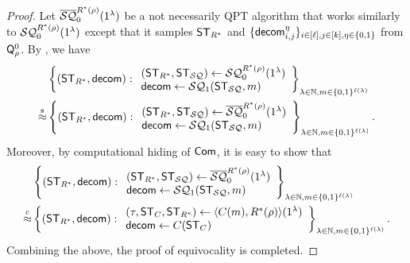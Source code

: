 \begin{proof}
Let $\overline{\mathcal{SQ}}_0^{R^*(\rho)}(1^\lambda)$ be a not necessarily QPT algorithm that works similarly to $\mathcal{SQ}_0^{R^*(\rho)}(1^\lambda)$ except that it samples $\mathsf{ST}_{R^*}$ and $\{\mathsf{decom}_{i,j}^{\eta}\}_{i\in[\ell],j\in[k],\eta\in\{0,1\}}$ from $\mathsf{Q}_\rho^0$.  
By , we have 
\begin{align*}
   &\left\{
   (\mathsf{ST}_{R^*},\mathsf{decom}):
   \begin{array}{ll}
   (\mathsf{ST}_{R^*},\mathsf{ST}_{\mathcal{SQ}})\gets \mathcal{SQ}_0^{R^*(\rho)}(1^\lambda)\\
   \mathsf{decom}\gets \mathcal{SQ}_1(\mathsf{ST}_{\mathcal{SQ}},m)
   \end{array}
   \right\}_{\lambda\in \mathbb{N},m\in \{0,1\}^{\ell(\lambda)}}\\
   \stackrel{\text{s}}{\approx}
   &\left\{
   (\mathsf{ST}_{R^*},\mathsf{decom}):
   \begin{array}{ll}
   (\mathsf{ST}_{R^*},\mathsf{ST}_{\mathcal{SQ}})\gets \overline{\mathcal{SQ}}_0^{R^*(\rho)}(1^\lambda)\\
   \mathsf{decom}\gets \mathcal{SQ}_1(\mathsf{ST}_{\mathcal{SQ}},m)
   \end{array}
   \right\}_{\lambda\in \mathbb{N},m\in \{0,1\}^{\ell(\lambda)}}.
\end{align*}
Moreover, by computational hiding of $\mathsf{Com}$, it is easy to show that 
\begin{align*}
   &\left\{
   (\mathsf{ST}_{R^*},\mathsf{decom}):
   \begin{array}{ll}
   (\mathsf{ST}_{R^*},\mathsf{ST}_{\mathcal{SQ}})\gets \overline{\mathcal{SQ}}_0^{R^*(\rho)}(1^\lambda)\\
   \mathsf{decom}\gets \mathcal{SQ}_1(\mathsf{ST}_{\mathcal{SQ}},m)
   \end{array}
   \right\}_{\lambda\in \mathbb{N},m\in \{0,1\}^{\ell(\lambda)}}\\
   \stackrel{\text{c}}{\approx}
    &\left\{
    (\mathsf{ST}_{R^*},\mathsf{decom}):
    \begin{array}{ll}
    (\tau,\mathsf{ST}_{C},\mathsf{ST}_{R^*})\gets \langle C(m),R^*(\rho) \rangle(1^\lambda)\\
    \mathsf{decom} \gets C(\mathsf{ST}_C)
    \end{array}
    \right\}_{\lambda\in \mathbb{N},m\in \{0,1\}^{\ell(\lambda)}}.
\end{align*}
Combining the above, the proof of equivocality is completed.
\end{proof}

